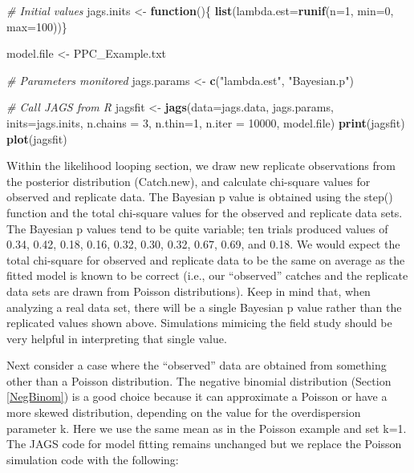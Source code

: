 \documentclass[
]{krantz}
\makeatletter
\newenvironment{Shaded}{\begin{snugshade}}{\end{snugshade}}
\newcommand{\AttributeTok}[1]{\textcolor[rgb]{0.27,0.27,0.27}{#1}}
\newcommand{\CommentTok}[1]{\textcolor[rgb]{0.37,0.37,0.37}{\textit{#1}}}
\newcommand{\ControlFlowTok}[1]{\textcolor[rgb]{0.27,0.27,0.27}{\textbf{#1}}}
\newcommand{\DecValTok}[1]{\textcolor[rgb]{0.06,0.06,0.06}{#1}}
\newcommand{\FunctionTok}[1]{\textcolor[rgb]{0.27,0.27,0.27}{\textbf{#1}}}
\newcommand{\NormalTok}[1]{#1}
\newcommand{\OtherTok}[1]{\textcolor[rgb]{0.37,0.37,0.37}{#1}}
\newcommand{\StringTok}[1]{\textcolor[rgb]{0.5,0.5,0.5}{#1}}
\newenvironment{kframe}{%
\medskip{}
\setlength{\fboxsep}{.8em}
 \def\at@end@of@kframe{}%
 \ifinner\ifhmode%
  \def\at@end@of@kframe{\end{minipage}}%
  \begin{minipage}{\columnwidth}%
 \fi\fi%
 \def\FrameCommand##1{\hskip\@totalleftmargin \hskip-\fboxsep
 \colorbox{shadecolor}{##1}\hskip-\fboxsep
     \hskip-\linewidth \hskip-\@totalleftmargin \hskip\columnwidth}%
 \MakeFramed {\advance\hsize-\width
   \@totalleftmargin\z@ \linewidth\hsize
   \@setminipage}}%
 {\par\unskip\endMakeFramed%
 \at@end@of@kframe}
\renewenvironment{Shaded}{\begin{kframe}}{\end{kframe}}
\makeatother
\begin{document}
\begin{Shaded}
\begin{Highlighting}[]
\CommentTok{\# Initial values}
\NormalTok{jags.inits }\OtherTok{\textless{}{-}} \ControlFlowTok{function}\NormalTok{()\{ }\FunctionTok{list}\NormalTok{(}\AttributeTok{lambda.est=}\FunctionTok{runif}\NormalTok{(}\AttributeTok{n=}\DecValTok{1}\NormalTok{, }\AttributeTok{min=}\DecValTok{0}\NormalTok{, }\AttributeTok{max=}\DecValTok{100}\NormalTok{))\}}

\NormalTok{model.file }\OtherTok{\textless{}{-}} \StringTok{\textquotesingle{}PPC\_Example.txt\textquotesingle{}}

\CommentTok{\# Parameters monitored}
\NormalTok{jags.params }\OtherTok{\textless{}{-}} \FunctionTok{c}\NormalTok{(}\StringTok{"lambda.est"}\NormalTok{, }\StringTok{"Bayesian.p"}\NormalTok{)}

\CommentTok{\# Call JAGS from R}
\NormalTok{jagsfit }\OtherTok{\textless{}{-}} \FunctionTok{jags}\NormalTok{(}\AttributeTok{data=}\NormalTok{jags.data, jags.params, }\AttributeTok{inits=}\NormalTok{jags.inits,}
                \AttributeTok{n.chains =} \DecValTok{3}\NormalTok{, }\AttributeTok{n.thin=}\DecValTok{1}\NormalTok{, }\AttributeTok{n.iter =} \DecValTok{10000}\NormalTok{,}
\NormalTok{                model.file)}
\FunctionTok{print}\NormalTok{(jagsfit)}
\FunctionTok{plot}\NormalTok{(jagsfit)}
\end{Highlighting}
\end{Shaded}

Within the likelihood looping section, we draw new replicate observations from the posterior distribution (Catch.new), and calculate chi-square values for observed and replicate data. The Bayesian p value is obtained using the step() function and the total chi-square values for the observed and replicate data sets. The Bayesian p values tend to be quite variable; ten trials produced values of 0.34, 0.42, 0.18, 0.16, 0.32, 0.30, 0.32, 0.67, 0.69, and 0.18. We would expect the total chi-square for observed and replicate data to be the same on average as the fitted model is known to be correct (i.e., our ``observed'' catches and the replicate data sets are drawn from Poisson distributions). Keep in mind that, when analyzing a real data set, there will be a single Bayesian p value rather than the replicated values shown above. Simulations mimicing the field study should be very helpful in interpreting that single value.

Next consider a case where the ``observed'' data are obtained from something other than a Poisson distribution. The negative binomial distribution (Section \ref{NegBinom}) is a good choice because it can approximate a Poisson or have a more skewed distribution, depending on the value for the overdispersion parameter k. Here we use the same mean as in the Poisson example and set k=1. The JAGS code for model fitting remains unchanged but we replace the Poisson simulation code with the following:
\end{document}
